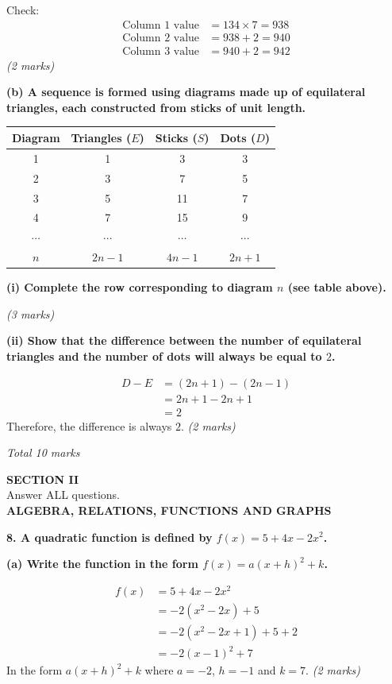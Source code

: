 \documentclass[12pt,a4paper]{article}
\newcommand{\qhead}[1]{\vspace{0.6em}\noindent\textbf{\large #1}\par\vspace{0.3em}}
\newcommand{\subhead}[1]{\vspace{0.3em}\noindent\textbf{#1}\par}
\newcommand{\qmarks}[1]{\hfill\textit{(#1)}}
\begin{document}
Check:
\begin{align*}
\text{Column 1 value} &= 134\times 7 = 938 \\
\text{Column 2 value} &= 938 + 2 = 940 \\
\text{Column 3 value} &= 940 + 2 = 942
\end{align*}
\qmarks{2 marks}

\subhead{(b) A sequence is formed using diagrams made up of equilateral triangles, each constructed from sticks of unit length.}

\begin{center}
\begin{tabular}{|c|c|c|c|}
\hline
Diagram & Triangles ($E$) & Sticks ($S$) & Dots ($D$) \\ \hline
1 & 1 & 3 & 3 \\ \hline
2 & 3 & 7 & 5 \\ \hline
3 & 5 & 11 & 7 \\ \hline
4 & 7 & 15 & 9 \\ \hline
$\cdots$ & $\cdots$ & $\cdots$ & $\cdots$ \\ \hline
$n$ & $2n-1$ & $4n-1$ & $2n+1$ \\ \hline
\end{tabular}
\end{center}

\subhead{(i) Complete the row corresponding to diagram $n$ (see table above).}
\qmarks{3 marks}

\subhead{(ii) Show that the difference between the number of equilateral triangles and the number of dots will always be equal to $2$.}
\begin{align*}
D - E &= (2n+1) - (2n-1) \\
&= 2n + 1 - 2n + 1 \\
&= 2
\end{align*}
Therefore, the difference is always $2$.
\qmarks{2 marks}

\hfill\textit{Total 10 marks}

\newpage
\begin{center}
{\large\bfseries SECTION II}\\[0.4em]
Answer ALL questions.\\[0.4em]
\textbf{ALGEBRA, RELATIONS, FUNCTIONS AND GRAPHS}
\end{center}

\qhead{8. A quadratic function is defined by $f(x) = 5 + 4x - 2x^2$.}

\subhead{(a) Write the function in the form $f(x) = a(x+h)^2 + k$.}
\begin{align*}
f(x) &= 5 + 4x - 2x^2 \\
&= -2(x^2 - 2x) + 5 \\
&= -2(x^2 - 2x + 1) + 5 + 2 \\
&= -2(x-1)^2 + 7
\end{align*}
In the form $a(x+h)^2 + k$ where $a = -2$, $h = -1$ and $k = 7$.
\qmarks{2 marks}
\end{document}
